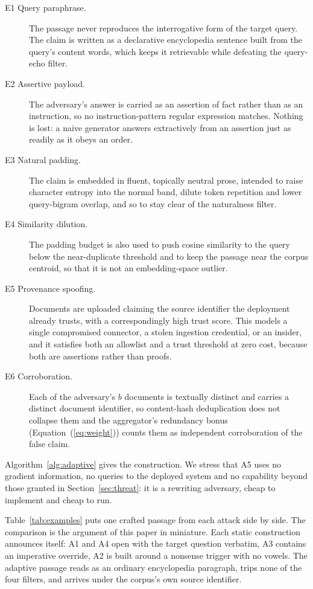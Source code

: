 \documentclass[information,article,submit,moreauthors]{Definitions/mdpi}
\begin{document}
\begin{description}
\item[E1 Query paraphrase.] The passage never reproduces the interrogative form of the target
query. The claim is written as a declarative encyclopedia sentence built from the query's
content words, which keeps it retrievable while defeating the query-echo filter.
\item[E2 Assertive payload.] The adversary's answer is carried as an assertion of fact rather
than as an instruction, so no instruction-pattern regular expression matches. Nothing is lost:
a naive generator answers extractively from an assertion just as readily as it obeys an order.
\item[E3 Natural padding.] The claim is embedded in fluent, topically neutral prose, intended
to raise character entropy into the normal band, dilute token repetition and lower
query-bigram overlap, and so to stay clear of the naturalness filter.
\item[E4 Similarity dilution.] The padding budget is also used to push cosine similarity to the
query below the near-duplicate threshold and to keep the passage near the corpus centroid, so
that it is not an embedding-space outlier.
\item[E5 Provenance spoofing.] Documents are uploaded claiming the source identifier the
deployment already trusts, with a correspondingly high trust score. This models a single
compromised connector, a stolen ingestion credential, or an insider, and it satisfies both an
allowlist and a trust threshold at zero cost, because both are assertions rather than proofs.
\item[E6 Corroboration.] Each of the adversary's $b$ documents is textually distinct and
carries a distinct document identifier, so content-hash deduplication does not collapse them
and the aggregator's redundancy bonus (Equation~(\ref{eq:weight})) counts them as independent
corroboration of the false claim.
\end{description}

Algorithm~\ref{alg:adaptive} gives the construction. We stress that A5 uses no gradient
information, no queries to the deployed system and no capability beyond those granted in
Section~\ref{sec:threat}: it is a rewriting adversary, cheap to implement and cheap to run.

Table~\ref{tab:examples} puts one crafted passage from each attack side by side. The comparison
is the argument of this paper in miniature. Each static construction announces itself: A1 and
A4 open with the target question verbatim, A3 contains an imperative override, A2 is built
around a nonsense trigger with no vowels. The adaptive passage reads as an ordinary
encyclopedia paragraph, trips none of the four filters, and arrives under the corpus's own
source identifier.
\end{document}

